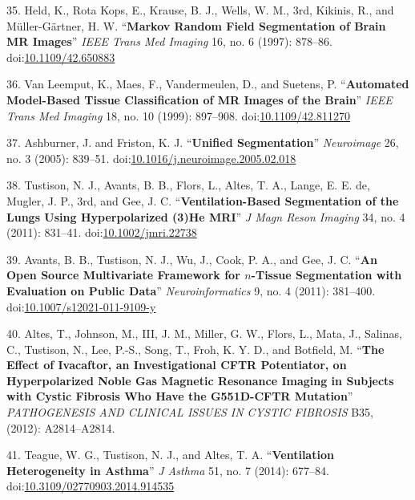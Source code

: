 \documentclass[11pt,]{article}
\begin{document}
\hypertarget{ref-Held:1997aa}{}
35. Held, K., Rota Kops, E., Krause, B. J., Wells, W. M., 3rd, Kikinis,
R., and Müller-Gärtner, H. W. ``\textbf{Markov Random Field Segmentation
of Brain MR Images}'' \emph{IEEE Trans Med Imaging} 16, no. 6 (1997):
878--86. doi:\href{https://doi.org/10.1109/42.650883}{10.1109/42.650883}

\hypertarget{ref-Van-Leemput:1999aa}{}
36. Van Leemput, K., Maes, F., Vandermeulen, D., and Suetens, P.
``\textbf{Automated Model-Based Tissue Classification of MR Images of
the Brain}'' \emph{IEEE Trans Med Imaging} 18, no. 10 (1999): 897--908.
doi:\href{https://doi.org/10.1109/42.811270}{10.1109/42.811270}

\hypertarget{ref-Ashburner:2005aa}{}
37. Ashburner, J. and Friston, K. J. ``\textbf{Unified Segmentation}''
\emph{Neuroimage} 26, no. 3 (2005): 839--51.
doi:\href{https://doi.org/10.1016/j.neuroimage.2005.02.018}{10.1016/j.neuroimage.2005.02.018}

\hypertarget{ref-Tustison:2011aa}{}
38. Tustison, N. J., Avants, B. B., Flors, L., Altes, T. A., Lange, E.
E. de, Mugler, J. P., 3rd, and Gee, J. C. ``\textbf{Ventilation-Based
Segmentation of the Lungs Using Hyperpolarized (3)He MRI}'' \emph{J Magn
Reson Imaging} 34, no. 4 (2011): 831--41.
doi:\href{https://doi.org/10.1002/jmri.22738}{10.1002/jmri.22738}

\hypertarget{ref-Avants:2011aa}{}
39. Avants, B. B., Tustison, N. J., Wu, J., Cook, P. A., and Gee, J. C.
``\textbf{An Open Source Multivariate Framework for \(n\)-Tissue
Segmentation with Evaluation on Public Data}'' \emph{Neuroinformatics}
9, no. 4 (2011): 381--400.
doi:\href{https://doi.org/10.1007/s12021-011-9109-y}{10.1007/s12021-011-9109-y}

\hypertarget{ref-Altes:2012aa}{}
40. Altes, T., Johnson, M., III, J. M., Miller, G. W., Flors, L., Mata,
J., Salinas, C., Tustison, N., Lee, P.-S., Song, T., Froh, K. Y. D., and
Botfield, M. ``\textbf{The Effect of Ivacaftor, an Investigational CFTR
Potentiator, on Hyperpolarized Noble Gas Magnetic Resonance Imaging in
Subjects with Cystic Fibrosis Who Have the G551D-CFTR Mutation}''
\emph{PATHOGENESIS AND CLINICAL ISSUES IN CYSTIC FIBROSIS} B35, (2012):
A2814--A2814.

\hypertarget{ref-Teague:2014aa}{}
41. Teague, W. G., Tustison, N. J., and Altes, T. A.
``\textbf{Ventilation Heterogeneity in Asthma}'' \emph{J Asthma} 51, no.
7 (2014): 677--84.
doi:\href{https://doi.org/10.3109/02770903.2014.914535}{10.3109/02770903.2014.914535}
\end{document}
